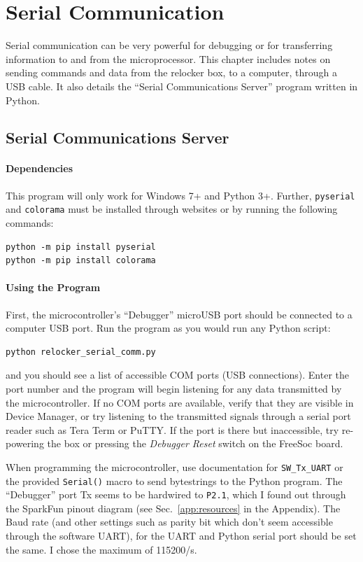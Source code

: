 \documentclass[10pt]{report}
\begin{document}
\chapter{Serial Communication}\label{chap:serialcomm}

Serial communication can be very powerful for debugging or for transferring information to and from the microprocessor. This chapter includes notes on sending commands and data from the relocker box, to a computer, through a USB cable. It also details the ``Serial Communications Server'' program written in Python.


\section{Serial Communications Server}
\label{sect:serial_comm_server}
\subsubsection{Dependencies}
This program will only work for Windows 7+ and Python 3+. Further, \texttt{pyserial} and \texttt{colorama} must be installed through websites or by running the following commands:
\begin{lstlisting}
python -m pip install pyserial
python -m pip install colorama
\end{lstlisting}

\subsubsection{Using the Program}
First, the microcontroller's ``Debugger'' microUSB port should be connected to a computer USB port. Run the program as you would run any Python script:
\begin{lstlisting}
python relocker_serial_comm.py
\end{lstlisting}
and you should see a list of accessible COM ports (USB connections). Enter the port number and the program will begin listening for any data transmitted by the microcontroller. If no COM ports are available, verify that they are visible in Device Manager, or try listening to the transmitted signals through a serial port reader such as Tera Term or PuTTY. If the port is there but inaccessible, try re-powering the box or pressing the \textit{Debugger Reset} switch on the FreeSoc board.

When programming the microcontroller, use documentation for \texttt{SW\_Tx\_UART} or the provided \texttt{Serial()} macro to send bytestrings to the Python program. The ``Debugger'' port Tx seems to be hardwired to \texttt{P2.1}, which I found out through the SparkFun pinout diagram (see Sec.~\ref{app:resources} in the Appendix). The Baud rate (and other settings such as parity bit which don't seem accessible through the software UART), for the UART and Python serial port should be set the same. I chose the maximum of 115200/s.
	
\end{document}
